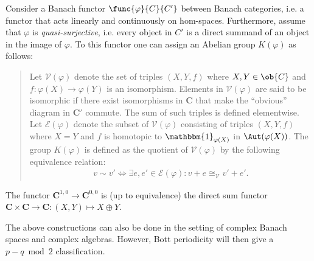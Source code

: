     \begin{construct}\label{clifford:functor_k_group}
        Consider a Banach functor $\func{\varphi}{C}{C'}$ between Banach categories, i.e. a functor that acts linearly and continuously on hom-spaces. Furthermore, assume that $\varphi$ is \textit{quasi-surjective}, i.e. every object in $C'$ is a direct summand of an object in the image of $\varphi$. To this functor one can assign an Abelian group $K(\varphi)$ as follows:
        \begin{quote}
            Let $\mathscr{V}(\varphi)$ denote the set of triples $(X,Y,f)$ where $X,Y\in\ob{C}$ and $f:\varphi(X)\rightarrow\varphi(Y)$ is an isomorphism. Elements in $\mathscr{V}(\varphi)$ are said to be isomorphic if there exist isomorphisms in $\mathbf{C}$ that make the ``obvious'' diagram in $\mathbf{C'}$ commute. The sum of such triples is defined elementwise. Let $\mathscr{E}(\varphi)$ denote the subset of $\mathscr{V}(\varphi)$ consisting of triples $(X,Y,f)$ where $X=Y$ and $f$ is homotopic to $\mathbbm{1}_{\varphi(X)}$ in $\Aut(\varphi(X))$. The group $K(\varphi)$ is defined as the quotient of $\mathscr{V}(\varphi)$ by the following equivalence relation:
            \begin{gather}
                v\sim v'\iff\exists e,e'\in\mathscr{E}(\varphi):v+e\cong_{\mathscr{V}} v'+e'.
            \end{gather}
        \end{quote}
    \end{construct}

    \begin{example}[$K^{0,0}(\mathbf{C})$]\label{clifford:k00}
        The functor $\mathbf{C}^{1,0}\rightarrow\mathbf{C}^{0,0}$ is (up to equivalence) the direct sum functor $\mathbf{C}\times\mathbf{C}\rightarrow\mathbf{C}:(X,Y)\mapsto X\oplus Y$.
    \end{example}

    \begin{remark}\label{clifford:complex_bott_periodicity}
        The above constructions can also be done in the setting of complex Banach spaces and complex algebras. However, Bott periodicity will then give a $p-q\bmod2$ classification.
    \end{remark}

